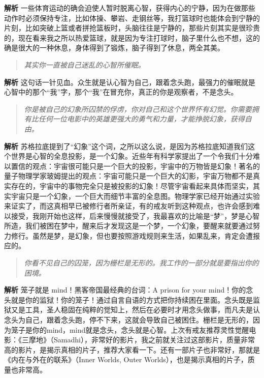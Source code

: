 \textbf{解析} 一些体育运动的确会迫使人暂时脱离心智，获得内心的宁静，因为在做那些动作时必须保持专注，比如体操、攀岩、走钢丝等，我打篮球时也能体会到宁静的片刻，比如突破上篮或者拼抢篮板时，头脑往往是宁静的，那些片刻其实是很珍贵的，现在看来我之所以热爱篮球，就是因为专注打球时，脑子里什么也不想，这的确是很大的一种休息，身体得到了锻炼，脑子得到了休息，两全其美。

\begin{quote}\it
    其实你一直被自己迷乱的心智所催眠。
\end{quote}

\textbf{解析} 这句话一针见血。众生就是认心智为自己，跟着念头跑，最强力的催眠就是心智中的那个“我”字，那个“我”在冒充你，真正的你是观察者，不是念头。

\begin{quote}\it
    你是被自己的幻象所囚禁的俘虏，你对自己和这个世界怀有幻觉。你需要拥有比任何一位电影中的英雄更强大的勇气和力量，才能挣脱幻象，获得自由。
\end{quote}

\textbf{解析} 苏格拉底提到了“幻象”这个词，之所以这么说，是因为苏格拉底知道我们这个世界是心智的全息投影，是一个幻象。近些年有科学家提出了一个令我们十分难以置信的观点：宇宙很可能只是一个巨大的投影，宇宙中的万物皆是幻象！著名的量子物理学家玻姆提出的观点：宇宙可能只是一个巨大的幻影，宇宙万物都不是真实存在的，宇宙中的事物完全只是被投影的幻象！尽管宇宙看起来具体而坚实，其实宇宙只是一个幻象，一个巨大而细节丰富的全息图。物理学家已经开始通过实验来证实了，而这真相早已被修行者所亲证，有的戒友听到这种观点，也许会感到难以接受，我刚开始也这样，后来慢慢就接受了，我最喜欢的比喻是“梦”，梦是心智所造，我们被困在梦中，醒来后才发现这是一个梦，一个幻象，要醒来就要通过努力修行。虽然是梦，是幻象，但也要按照游戏规则来生活，如果乱来，肯定会遭报应的。

\begin{quote}\it
    你看不见自己的囚笼，因为栅栏是无形的。我工作的一部分就是要指出你的困境。
\end{quote}

\textbf{解析} 笼子就是 mind！黑客帝国最经典的台词：A prison for your mind！你的念头就是你的监狱！你的笼子！通过自言自语的方式把你持续困在里面。念头既是监狱又是工具，圣人稳固在纯粹的觉知上，然后在必要时才用念头做事，而凡夫是认念头为自己，跟着念头跑，停不下来，这就会导致自己被困住。栅栏是无形的，因为笼子是你的mind，mind就是念头，念头就是心智。上次有戒友推荐灵性觉醒电影：《三摩地》（Samadhi），非常好的影片，我之前就关注过这部影片，质量非常高的影片，是揭示真相的片子，推荐大家看一下。还有一部片子也非常好，那就是《内在与外在的联系》（Inner Worlds, Outer Worlds），也是揭示真相的片子，质量也非常高。

